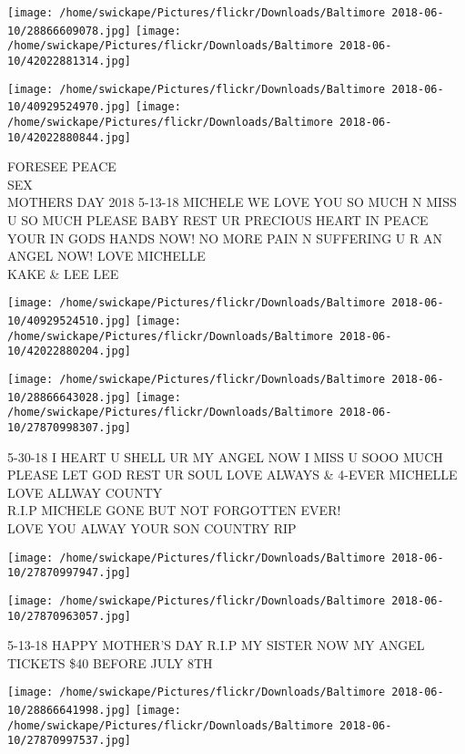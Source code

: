 \documentclass[10pt,letterpaper]{article}
\begin{document}
\texttt{[image: /home/swickape/Pictures/flickr/Downloads/Baltimore 2018-06-10/28866609078.jpg]}
\texttt{[image: /home/swickape/Pictures/flickr/Downloads/Baltimore 2018-06-10/42022881314.jpg]}

\texttt{[image: /home/swickape/Pictures/flickr/Downloads/Baltimore 2018-06-10/40929524970.jpg]}
\texttt{[image: /home/swickape/Pictures/flickr/Downloads/Baltimore 2018-06-10/42022880844.jpg]}

FORESEE PEACE\\
SEX\\
MOTHERS DAY 2018 5{-}13{-}18 MICHELE WE LOVE YOU SO MUCH N MISS U SO MUCH PLEASE BABY REST UR PRECIOUS HEART IN PEACE YOUR IN GODS HANDS NOW!  NO MORE PAIN N SUFFERING U R AN ANGEL NOW!  LOVE MICHELLE\\
KAKE \& LEE LEE\\
\pagebreak

\texttt{[image: /home/swickape/Pictures/flickr/Downloads/Baltimore 2018-06-10/40929524510.jpg]}
\texttt{[image: /home/swickape/Pictures/flickr/Downloads/Baltimore 2018-06-10/42022880204.jpg]}

\texttt{[image: /home/swickape/Pictures/flickr/Downloads/Baltimore 2018-06-10/28866643028.jpg]}
\texttt{[image: /home/swickape/Pictures/flickr/Downloads/Baltimore 2018-06-10/27870998307.jpg]}

5{-}30{-}18 I HEART U SHELL UR MY ANGEL NOW I MISS U SOOO MUCH PLEASE LET GOD REST UR SOUL LOVE ALWAYS \& 4{-}EVER MICHELLE\\
LOVE ALLWAY COUNTY\\
R.I.P MICHELE GONE BUT NOT FORGOTTEN EVER!\\
LOVE YOU ALWAY YOUR SON COUNTRY RIP\\
\pagebreak

\texttt{[image: /home/swickape/Pictures/flickr/Downloads/Baltimore 2018-06-10/27870997947.jpg]}

\vspace{0.25in}
\texttt{[image: /home/swickape/Pictures/flickr/Downloads/Baltimore 2018-06-10/27870963057.jpg]}

5{-}13{-}18 HAPPY MOTHER'S DAY R.I.P MY SISTER NOW MY ANGEL\\
TICKETS \$40 BEFORE JULY 8TH\\
\pagebreak

\texttt{[image: /home/swickape/Pictures/flickr/Downloads/Baltimore 2018-06-10/28866641998.jpg]}
\texttt{[image: /home/swickape/Pictures/flickr/Downloads/Baltimore 2018-06-10/27870997537.jpg]}
\end{document}
